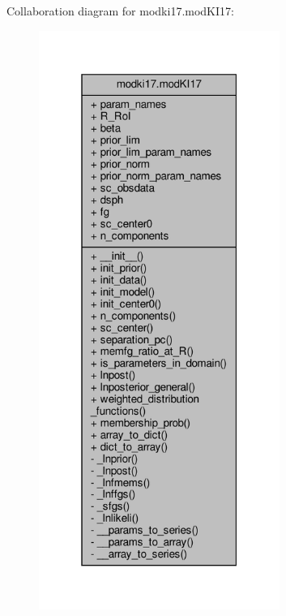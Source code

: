 Collaboration diagram for modki17.\+mod\+K\+I17\+:\nopagebreak
\begin{figure}[H]
\begin{center}
\leavevmode
\includegraphics[width=223pt]{dd/dbd/classmodki17_1_1modKI17__coll__graph}
\end{center}
\end{figure}
